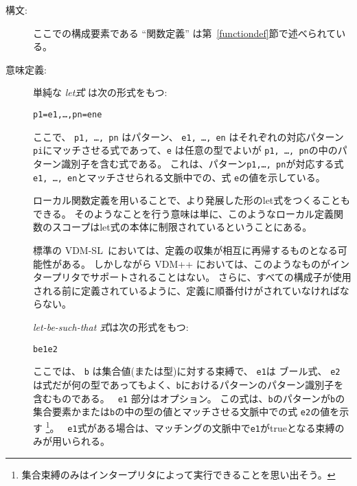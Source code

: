 \documentclass[\pformat,12pt]{jarticle}
\newcommand{\vdmslpp}[2]{%
#2
}
\newcommand{\vdmsl}{VDM-SL}
\newcommand{\vdmpp}{VDM++}
\begin{document}
\begin{description}
\item[構文:]





  \noindent ここでの構成要素である ``関数定義'' は第~\ref{functiondef}節で述べられている。

\item[意味定義:] 単純な {\it let式} は次の形式をもつ:
  \begin{alltt}
     p1 = e1, \ldots, pn = en  e
  \end{alltt}
ここで、 {\tt p1, \ldots, pn} はパターン、 {\tt e1, \ldots, en} はそれぞれの対応パターン {\tt pi}にマッチさせる式であって、{\tt e} は任意の型でよいが {\tt p1, \ldots, pn}の中のパターン識別子を含む式である。 
これは、パターン{\tt p1,\ldots, pn}が対応する式{\tt e1, \ldots, en}とマッチさせられる文脈中での、式 {\tt e}の値を示している。 

 ローカル関数定義を用いることで、より発展した形のlet式をつくることもできる。
そのようなことを行う意味は単に、このようなローカル定義関数のスコープはlet式の本体に制限されているということにある。

標準の \vdmsl\ においては、定義の収集が相互に再帰するものとなる可能性がある。
しかしながら\vdmslpp{\vdmsl}{\vdmpp}においては、このようなものがインタープリタでサポートされることはない。 
さらに、すべての構成子が使用される前に定義されているように、定義に順番付けがされていなければならない。
     
   {\it let-be-such-that 式}は次の形式をもつ:
  \begin{alltt}
     b  e1  e2
  \end{alltt}%
ここでは、 {\tt b} は集合値(または型)に対する束縛で、 {\tt e1}は ブール式、 {\tt e2} は式だが何の型であってもよく、{\tt b}におけるパターンのパターン識別子を含むものである。
 {\tt {} e1} 部分はオプション。
この式は、{\tt b}のパターンが{\tt b}の集合要素かまたは{\tt b}の中の型の値とマッチさせる文脈中での式 {\tt e2}の値を示す
  \footnote{集合束縛のみはインタープリタによって実行できることを思い出そう。}。 {\tt {} e1}式がある場合は、マッチングの文脈中で{\tt e1}がtrueとなる束縛のみが用いられる。


\end{description}
\end{document}
